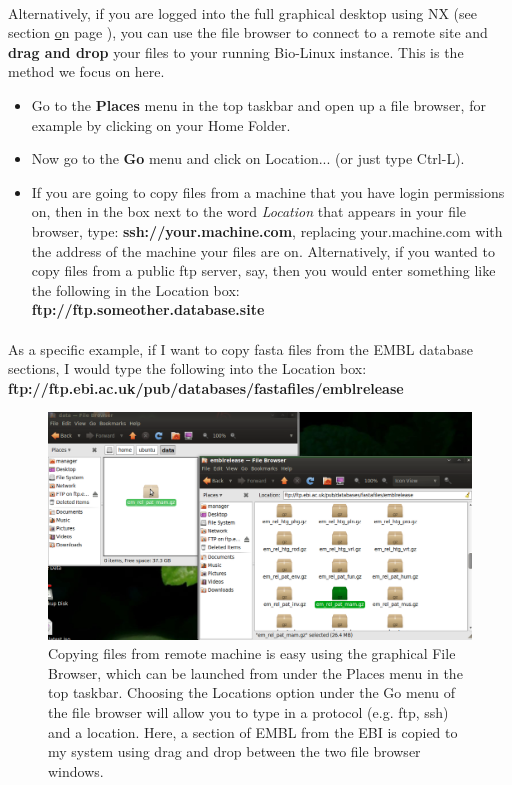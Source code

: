 \paragraph{}Alternatively, if you are logged into the full graphical desktop using NX (see section \href{section:nx} on page \pageref{section:nx}), you can use the file browser to connect to a remote site and \textbf{drag and drop} your files to your running Bio-Linux instance. This is the method we focus on here.
\begin{itemize}

\item Go to the \textbf{Places} menu in the top taskbar and open up a file browser, for example by clicking on your Home Folder. 
\item Now go to the \textbf{Go} menu and click on Location... (or just type Ctrl-L). 
\item If you are going to copy files from a machine that you have login permissions on, then in the box next to the word \emph{Location} that appears in your file browser, type:
\textbf{ssh://your.machine.com}, replacing your.machine.com with the address of the machine your files are on. Alternatively, if you wanted to copy files from a public ftp server, say, then you would enter something like the following in the Location box: 
\\\textbf{ftp://ftp.someother.database.site}
\end{itemize}

\paragraph{}As a specific example, if I want to copy fasta files from the EMBL database sections, I would type the following into the Location box: 
\\\textbf{ftp://ftp.ebi.ac.uk/pub/databases/fastafiles/emblrelease}

\begin{figure}[!hd]
\includegraphics[width=\maxwidth]{"images/graphicalFTP_full"}
\caption[Drag and drop from remote machine]{\label{fig:graphicalftp}Copying files from remote machine is easy using the graphical File Browser, which can be launched from under the Places menu in the top taskbar. Choosing the Locations option under the Go menu of the file browser will allow you to type in a protocol (e.g. ftp, ssh) and a location. Here, a section of EMBL from the EBI is copied to my system using drag and drop between the two file browser windows.}
\end{figure}

